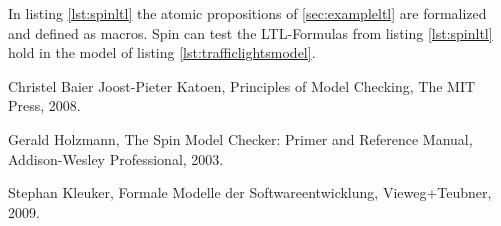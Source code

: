 \documentclass[a4paper, twoside]{article}
\begin{document}
In listing \ref{lst:spinltl} the atomic propositions of \ref{sec:exampleltl} are formalized and defined as macros. Spin can test the LTL-Formulas from listing \ref{lst:spinltl} hold in the model of listing \ref{lst:trafficlightsmodel}.

\begin{thebibliography}{9}
Christel Baier Joost-Pieter Katoen,
Principles of Model Checking,
The MIT Press,
2008.

Gerald Holzmann,
The Spin Model Checker: Primer and Reference Manual,
Addison-Wesley Professional,
2003.

Stephan Kleuker,
Formale Modelle der Softwareent\-wicklung,
View\-eg+\-Teub\-ner,
2009.

\end{thebibliography}
\end{document}
